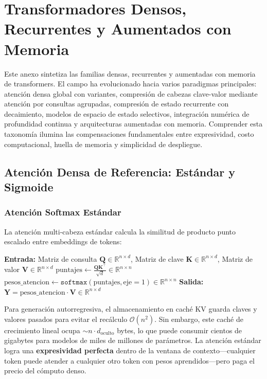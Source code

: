 \section{Transformadores Densos, Recurrentes y Aumentados con Memoria}
\label{sec:annex-transformer}

Este anexo sintetiza las familias densas, recurrentes y aumentadas con memoria de transformers. El campo ha evolucionado hacia varios paradigmas principales: atención densa global con variantes, compresión de cabezas clave-valor mediante atención por consultas agrupadas, compresión de estado recurrente con decaimiento, modelos de espacio de estado selectivos, integración numérica de profundidad continua y arquitecturas aumentadas con memoria. Comprender esta taxonomía ilumina las compensaciones fundamentales entre expresividad, costo computacional, huella de memoria y simplicidad de despliegue.

\subsection{Atención Densa de Referencia: Estándar y Sigmoide}

\subsubsection{Atención Softmax Estándar}
La atención multi-cabeza estándar \citep{vaswani_attention_2017} calcula la similitud de producto punto escalado entre embeddings de tokens:

\begin{algorithmic}[1]
\State \textbf{Entrada:} Matriz de consulta $\mathbf{Q} \in \mathbb{R}^{n \times d}$, Matriz de clave $\mathbf{K} \in \mathbb{R}^{n \times d}$, Matriz de valor $\mathbf{V} \in \mathbb{R}^{n \times d}$
\State $\text{puntajes} \gets \frac{\mathbf{Q}\mathbf{K}^\top}{\sqrt{d}} \in \mathbb{R}^{n \times n}$ 
\State $\text{pesos\_atencion} \gets \texttt{softmax}(\text{puntajes}, \text{eje}=1) \in \mathbb{R}^{n \times n}$ 
\State \textbf{Salida:} $\mathbf{Y} = \text{pesos\_atencion} \cdot \mathbf{V} \in \mathbb{R}^{n \times d}$ 
\end{algorithmic}

Para generación autorregresiva, el almacenamiento en caché KV guarda claves y valores pasados para evitar el recálculo $\mathcal{O}(n^2)$. Sin embargo, este caché de crecimiento lineal ocupa $\sim n \cdot d_{\text{oculto}}$ bytes, lo que puede consumir cientos de gigabytes para modelos de miles de millones de parámetros. La atención estándar logra una \textbf{expresividad perfecta} dentro de la ventana de contexto---cualquier token puede atender a cualquier otro token con pesos aprendidos---pero paga el precio del cómputo denso.

